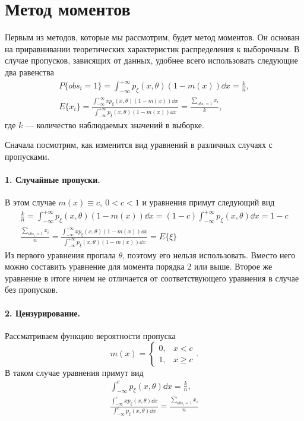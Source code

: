 \section{Метод моментов}

    Первым из методов, которые мы рассмотрим, будет метод моментов. Он основан на приравнивании теоретических характеристик распределения к выборочным. В случае пропусков, зависящих от данных, удобнее всего использовать следующие два равенства
    \begin{gather*}
        P\{obs_i = 1\} = \int_{-\infty}^{+\infty}p_\xi(x,\theta)(1 - m(x))\dd x = \frac{k}{n}, \\
        E\{x_i\} = \frac{\int_{-\infty}^{+\infty}xp_\xi(x,\theta)(1-m(x))\dd x}{\int_{-\infty}^{+\infty}p_\xi(x,\theta)(1-m(x))\dd x} = \frac{\sum_{obs_i = 1}x_i}{k},
    \end{gather*}
    где $k$ --- количество наблюдаемых значений в выборке.

    Сначала посмотрим, как изменится вид уравнений в различных случаях с пропусками.

    \paragraph{1. Случайные пропуски.} В этом случае $m(x) \equiv c,\ 0 < c < 1$ и уравнения 
    примут следующий вид
    \begin{gather*}
        \frac{k}{n} = \int_{-\infty}^{+\infty}p_\xi(x,\theta)(1-m(x))\dd x = 
            (1-c)\int_{-\infty}^{+\infty}p_\xi(x,\theta)\dd x = 1-c \\
        \frac{\sum_{obs_i = 1}x_i}{n} = 
            \frac{\int_{-\infty}^{+\infty}xp_\xi(x,\theta)(1-m(x))\dd x}%
                {\int_{-\infty}^{+\infty}p_\xi(x,\theta)(1-m(x))\dd x} = E\{\xi\}
    \end{gather*}
    Из первого уравнения пропала $\theta$, поэтому его нельзя использовать. Вместо него можно
    составить уравнение для момента порядка 2 или выше. Второе же уравнение в итоге ничем не отличается от
    соответствующего уравнения в случае без пропусков.

    \paragraph{2. Цензурирование.} Рассматриваем функцию вероятности пропуска
    \begin{equation*}
        m(x) = \begin{cases}
            0, & x < c \\
            1, & x \ge c
        \end{cases}.
    \end{equation*}
    В таком случае уравнения примут вид
    \begin{gather*}
        \int_{-\infty}^{c}p_\xi(x,\theta)\dd x = \frac{k}{n}, \\
        \frac{\int_{-\infty}^{c}xp_\xi(x,\theta)\dd x}{\int_{-\infty}^{c}p_\xi(x,\theta)\dd x} = \frac{\sum_{obs_i = 1}x_i}{n}
    \end{gather*}

